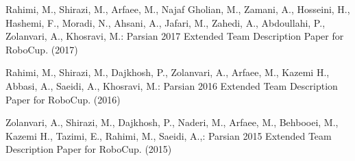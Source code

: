 \documentclass{llncs}
\begin{document}
\newpage

\begin{thebibliography}{5}
%
Rahimi, M., Shirazi, M., Arfaee, M., Najaf Gholian, M., Zamani, A., Hosseini, H., Hashemi, F., Moradi, N., Ahsani, A., Jafari, M., Zahedi, A., Abdoullahi, P., Zolanvari, A., Khosravi, M.:
Parsian 2017 Extended Team Description Paper for RoboCup. (2017)

Rahimi, M., Shirazi, M., Dajkhosh, P., Zolanvari, A., Arfaee, M., Kazemi H., Abbasi, A., Saeidi, A., Khosravi, M.:
Parsian 2016 Extended Team Description Paper for RoboCup. (2016)

Zolanvari, A., Shirazi, M., Dajkhosh, P., Naderi, M., Arfaee, M., Behbooei, M., Kazemi H., Tazimi, E., Rahimi, M., Saeidi, A.,:
Parsian 2015 Extended Team Description Paper for RoboCup. (2015)

\end{thebibliography}
\end{document}

